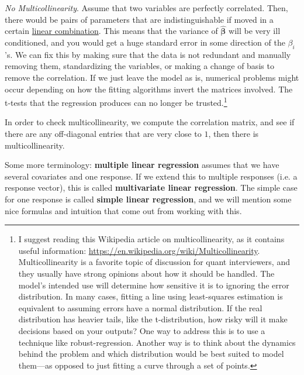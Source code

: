 \textit{No Multicollinearity}. Assume that two variables are perfectly correlated. Then, there would be pairs of parameters that are indistinguishable if moved in a certain \hyperref[lin-def:linear-combination]{linear combination}. This means that the variance of $\hat{\boldsymbol{\beta}}$ will be very ill conditioned, and you would get a huge standard error in some direction of the $\beta_i$'s. We can fix this by making sure that the data is not redundant and manually removing them, standardizing the variables, or making a change of basis to remove the correlation. If we just leave the model as is, numerical problems might occur depending on how the fitting algorithms invert the matrices involved. The t-tests that the regression produces can no longer be trusted.\footnote{I suggest reading this Wikipedia article on multicollinearity, as it contains useful information: \url{https://en.wikipedia.org/wiki/Multicollinearity}. Multicollinearity is a favorite topic of discussion for quant interviewers, and they usually have strong opinions about how it should be handled. The model's intended use will determine how sensitive it is to ignoring the error distribution. In many cases, fitting a line using least-squares estimation is equivalent to assuming errors have a normal distribution. If the real distribution has heavier tails, like the t-distribution, how risky will it make decisions based on your outputs? One way to address this is to use a technique like robust-regression. Another way is to think about the dynamics behind the problem and which distribution would be best suited to model them---as opposed to just fitting a curve through a set of points.} 

In order to check multicollinearity, we compute the correlation matrix, and see if there are any off-diagonal entries that are very close to $1$, then there is multicollinearity. 

Some more terminology: \textbf{multiple linear regression} assumes that we have several covariates and one response. If we extend this to multiple responses (i.e. a response vector), this is called \textbf{multivariate linear regression}. The simple case for one response is called \textbf{simple linear regression}, and we will mention some nice formulas and intuition that come out from working with this. 

